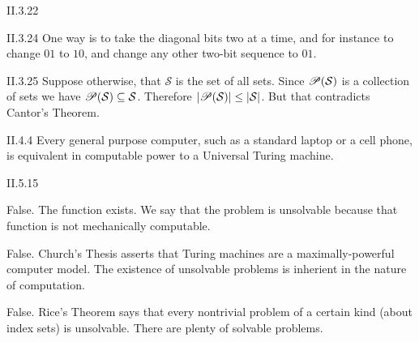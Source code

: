 %
%
%
%
\begin{ans}{II.3.22}
\begin{exparts}
\item
\end{exparts}
\end{ans}
%
%
\begin{ans}{II.3.24}
One way is to take the diagonal bits two at a time, and
for instance to change $01$ to $10$, and change any other two-bit
sequence to $01$.
\end{ans}
%
\begin{ans}{II.3.25}
Suppose otherwise, that $\mathcal{S}$ is the set of all sets.
Since $\mathscr{P}(\mathcal{S})$ is a collection of sets we have
$\mathscr{P}(\mathcal{S})\subseteq \mathcal{S}$.
Therefore $\lvert\mathscr{P}(\mathcal{S})\rvert\leq\lvert\mathcal{S}\rvert$.
But that contradicts Cantor's Theorem.
\end{ans}
%
\begin{ans}{II.4.4}
Every general purpose computer, such as a standard laptop or a cell phone,
is equivalent in computable power to a Universal Turing machine.
\end{ans}
%
%
%
%
%
\begin{ans}{II.5.15}
\begin{exparts}
\item
False.
The function exists.
We say that the problem is unsolvable because that function is not
mechanically computable.
\item
False.
Church's Thesis asserts that Turing machines are a maximally-powerful
computer model.
The existence of unsolvable problems is inherient in the nature of computation.
\item
False.
Rice's Theorem says that every nontrivial problem of a certain kind
(about index sets) is unsolvable.
There are plenty of solvable problems.
\end{exparts}
\end{ans}
%
%
%
